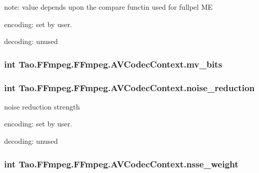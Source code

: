 \label{struct_tao_1_1_f_fmpeg_1_1_f_fmpeg_1_1_a_v_codec_context_afc033e4f7de2930d3a6ad7d8cae1f8b6}
note: value depends upon the compare functin used for fullpel ME
\begin{DoxyItemize}
\item encoding: set by user.
\item decoding: unused 
\end{DoxyItemize}\hypertarget{struct_tao_1_1_f_fmpeg_1_1_f_fmpeg_1_1_a_v_codec_context_a2f379349ae2359138300a967e49efc4e}{
\subsubsection[{mv\_\-bits}]{\setlength{\rightskip}{0pt plus 5cm}int {\bf Tao.FFmpeg.FFmpeg.AVCodecContext.mv\_\-bits}}}
\label{struct_tao_1_1_f_fmpeg_1_1_f_fmpeg_1_1_a_v_codec_context_a2f379349ae2359138300a967e49efc4e}
\hypertarget{struct_tao_1_1_f_fmpeg_1_1_f_fmpeg_1_1_a_v_codec_context_a89a99007aeb33c6c4801f3b88230a42f}{
\subsubsection[{noise\_\-reduction}]{\setlength{\rightskip}{0pt plus 5cm}int {\bf Tao.FFmpeg.FFmpeg.AVCodecContext.noise\_\-reduction}}}
\label{struct_tao_1_1_f_fmpeg_1_1_f_fmpeg_1_1_a_v_codec_context_a89a99007aeb33c6c4801f3b88230a42f}
noise reduction strength
\begin{DoxyItemize}
\item encoding: set by user.
\item decoding: unused 
\end{DoxyItemize}\hypertarget{struct_tao_1_1_f_fmpeg_1_1_f_fmpeg_1_1_a_v_codec_context_ada6d5e69e5a1b09065fef8645cc4f3ab}{
\subsubsection[{nsse\_\-weight}]{\setlength{\rightskip}{0pt plus 5cm}int {\bf Tao.FFmpeg.FFmpeg.AVCodecContext.nsse\_\-weight}}}
